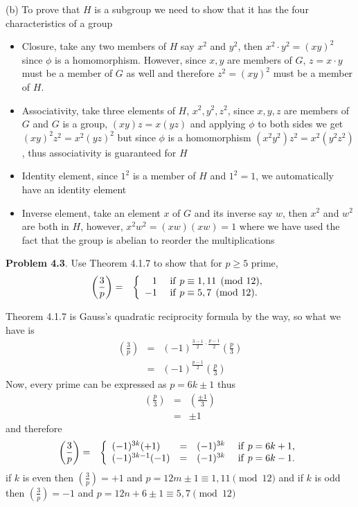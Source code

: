 \documentclass[aps,preprint,preprintnumbers,nofootinbib,showpacs,prd]{revtex4-1}
\newcommand{\bit}{\begin{itemize}}
\newcommand{\eit}{\end{itemize}}
\newcommand{\nbea}{\begin{eqnarray*}}
\newcommand{\neea}{\end{eqnarray*}}
\begin{document}
(b) To prove that $H$ is a subgroup we need to show that it has the four characteristics of a group
%
\bit
\item Closure, take any two members of $H$ say $x^2$ and $y^2$, then $x^2 \cdot y^2 = (xy)^2$ since $\phi$ is a homomorphism. However, since $x,y$ are members of $G$, $z = x\cdot y$ must be a member of $G$ as well and therefore $z^2 = (xy)^2$ must be a member of $H$.
\item Associativity, take three elements of $H$, $x^2,y^2,z^2$, since $x,y,z$ are members of $G$ and $G$ is a group, $(xy)z = x(yz)$ and applying $\phi$ to both sides we get $(xy)^2z^2 = x^2(yz)^2$ but since $\phi$ is a homomorphism $(x^2y^2)z^2 = x^2(y^2z^2)$, thus associativity is guaranteed for $H$
\item Identity element, since $1^2$ is a member of $H$ and $1^2=1$, we automatically have an identity element
\item Inverse element, take an element $x$ of $G$ and its inverse say $w$, then $x^2$ and $w^2$ are both in $H$, however, $x^2w^2 = (xw)(xw) = 1$ where we have used the fact that the group is abelian to reorder the multiplications
\eit
%



{\bf Problem 4.3}. Use Theorem 4.1.7 to show that for $p \ge 5$ prime, 
%
\nbea
\left( \frac{3}{p} \right ) & = & \left \{
\begin{array}{r l}
 1 & {\rm~if~} p \equiv 1,11 \pmod {12},\\ 
 -1 & {\rm~if~} p \equiv 5,7 \pmod {12}.
\end{array} \right.
\neea
%

Theorem 4.1.7 is Gauss's quadratic reciprocity formula by the way, so what we have is
%
\nbea
\left( \frac{3}{p} \right ) & = & (-1)^{\frac{3-1}{2}\cdot\frac{p-1}{2}} \left( \frac{p}{3} \right ) \\
& = & (-1)^{\frac{p-1}{2}} \left( \frac{p}{3} \right ) 
\neea
%
Now, every prime can be expressed as $p = 6k \pm 1$ thus
%
\nbea
\left( \frac{p}{3} \right ) & = & \left( \frac{\pm 1}{3} \right ) \\
& = & \pm 1
\neea
%
and therefore
%
\nbea
\left( \frac{3}{p} \right ) & = & \left \{
\begin{array}{l c l l}
(-1)^{3k}(+1) & = & (-1)^{3k} & {\rm~if~} p = 6k + 1,\\ 
(-1)^{3k-1}(-1) & = & (-1)^{3k} & {\rm~if~} p = 6k - 1.
\end{array} \right.
\neea
%
if $k$ is even then $\left( \frac{3}{p} \right ) = +1$ and $p = 12m \pm 1 \equiv 1,11 \pmod{12}$ and if $k$ is odd then $\left( \frac{3}{p} \right ) = -1$ and $p = 12n + 6 \pm 1 \equiv 5,7 \pmod{12}$
\end{document}
